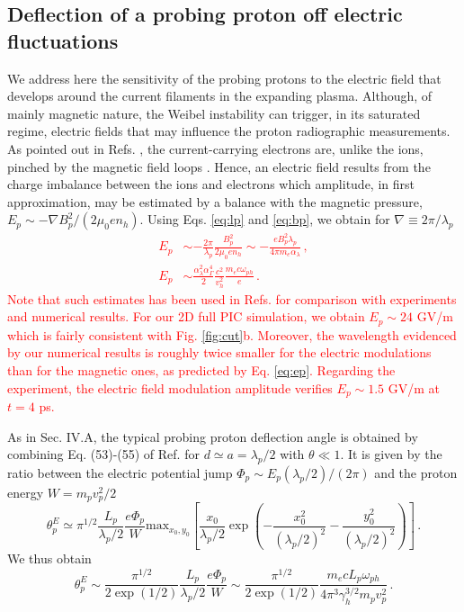 \documentclass[aps,showpacs,superscriptaddress]{revtex4}
\begin{document}
\subsection{Deflection of a probing proton off electric fluctuations}
 We address here the sensitivity of the probing protons to the electric field that develops around the current filaments in the expanding plasma.
Although, of mainly magnetic nature, the Weibel instability can trigger, in its saturated regime, electric fields  that may influence the proton radiographic measurements.
As pointed out in Refs. \cite{POP_Dieckmann_2009, POP_Bret_Gremillet_2010}, the current-carrying electrons  are,  unlike the ions,  pinched by the magnetic field loops . Hence, an electric field  results from the charge imbalance between the  ions and electrons which amplitude, in first approximation, may be estimated by a balance with the  magnetic pressure, $E_p \sim  - \nabla B_p^2/(2 \mu_0e n_h)$. 
Using Eqs. \eqref{eq:lp} and  \eqref{eq:bp}, we obtain  for $\nabla\equiv 2\pi/\lambda_p$
\textcolor{red}{
\begin{align}
E_p& \sim -  \frac{2\pi}{\lambda_p} \frac{B_p^2}{ 2\mu_0 e n_h }
\sim -  \frac{eB_p^2 \lambda_p}{  4\pi  m_e \alpha_\lambda} \, ,
 \label{eq:ep1}  \\
E_p& \sim \frac{\alpha_\lambda^2 \alpha_\Gamma^4}{2} \frac{c^2}{v_h^2} \frac{m_ec\omega_{ph}}{e  }   \label{eq:ep}
 \, .
\end{align}
Note that such estimates has been used  in Refs. \cite{POP_Dieckmann_2009,POP_Ruyer_2015,PRL_Gode_2017} for comparison with experiments and numerical results.  
For our 2D full PIC simulation, we obtain $E_p\sim 24 $ GV/m which is fairly consistent with Fig. \ref{fig:cut}b. Moreover, the  wavelength evidenced by our numerical results is roughly twice smaller for the electric modulations than for the magnetic ones, as predicted by Eq. \eqref{eq:ep}. Regarding the experiment, the electric field modulation amplitude verifies  $E_p \sim 1.5$ GV/m at $t=4$ ps.}

As in Sec. IV.A, the typical probing proton deflection angle is obtained by combining Eq.  (53)-(55) of Ref. \cite[]{RSI_protograhyb} for $d\simeq a= \lambda_p/2 $
with $\theta \ll 1$. 
It is given by the ratio between the electric potential jump $\Phi_p\sim E_p(\lambda_p/2)/(2\pi)$ and the proton energy $W = m_pv_p^2/2$ 
\begin{equation}\label{eq:alphaep0}
\theta^E_p \simeq \pi^{1/2}  \frac{L_p}{\lambda_p/2} \frac{e \Phi_p }{W}  \mathrm{max}_{x_0,y_0}\left[  
\frac{x_0}{\lambda_p/2}\exp\left(-\frac{x_0^2}{(\lambda_p/2)^2}-\frac{y_0^2}{ (\lambda_p/2)^2} \right) 
\right] \, .
\end{equation}
We thus obtain
\begin{equation}\label{eq:alphaep}
 \theta^E_p \sim \frac{\pi^{1/2}}{2\exp(1/2)} \frac{L_p}{\lambda_p/2} \frac{e \Phi_p }{W} 
 \sim  \frac{\pi^{1/2}}{2\exp(1/2)}   \frac{m_ecL_p\omega_{ph}}{4\pi^3\gamma_h^{3/2}m_p v_p^2 }
 \, .
\end{equation}
\end{document}
